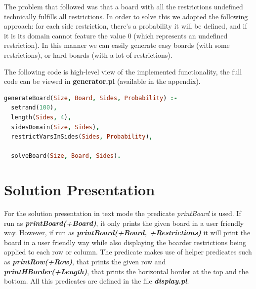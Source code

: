 \documentclass{llncs}
\begin{document}
The problem that followed was that a board with all the restrictions undefined technically fulfills all restrictions. In order to solve this we adopted the following approach: for each side restriction, there's a probability it will be defined, and if it is its domain cannot feature the value 0 (which represents an undefined restriction). In this manner we can easily generate easy boards (with some restrictions), or hard boards (with a lot of restrictions).

The following code is high-level view of the implemented functionality, the full code can be viewed in \textbf{generator.pl} (available in the appendix).

\begin{lstlisting}[language=Prolog]
generateBoard(Size, Board, Sides, Probability) :-
  setrand(100),
  length(Sides, 4),
  sidesDomain(Size, Sides),
  restrictVarsInSides(Sides, Probability),

  solveBoard(Size, Board, Sides).
\end{lstlisting}

%
\section{Solution Presentation}

For the solution presentation in text mode the predicate \textit{printBoard} is used. If run as \textbf{\textit{printBoard(+Board)}}, it only prints the given board in a user friendly way. However, if run as \textbf{\textit{printBoard(+Board, +Restrictions)}} it will print the board in a user friendly way while also displaying the boarder restrictions being applied to each row or column. The predicate makes use of helper predicates such as \textbf{\textit{printRow(+Row)}}, that prints the given row and \textbf{\textit{printHBorder(+Length)}}, that prints the horizontal border at the top and the bottom. All this predicates are defined in the file \textbf{\textit{display.pl}}.
\end{document}
